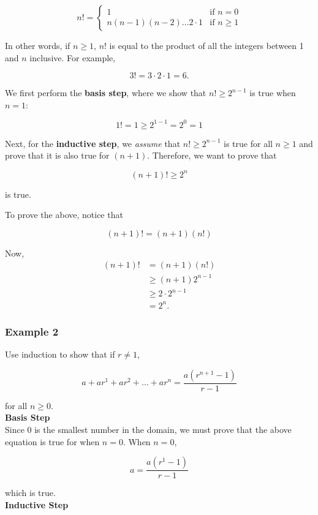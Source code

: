 \[ n! = \begin{cases} 
    1 & \text{if } n = 0 \\
    n(n - 1)(n - 2)\dots 2 \cdot 1 & \text{if } n \geq 1
 \end{cases}
\]

In other words, if $n \geq 1$, $n!$ is equal to the product of all the integers between 1 and $n$ inclusive.  For example, 

\[
 3! = 3 \cdot 2 \cdot 1 = 6.
\]

We first perform the \textbf{basis step}, where we show that $n! \geq 2^{n - 1}$ is true when $n = 1$:

\[
 1! = 1 \geq 2^{1 - 1} = 2^0 = 1
\]

Next, for the \textbf{inductive step}, we \textit{assume} that $n! \geq 2^{n - 1}$ is true for all $n \geq 1$ and prove that it is also true for $(n + 1)$.  Therefore, we want to prove that

\[
    (n + 1)! \geq 2^{n}
\]

is true.

To prove the above, notice that

\[
 (n + 1)! = (n + 1)(n!)
\]

Now,
\begin{align*}
    (n + 1)! &= (n + 1)(n!)\\
    &\geq (n + 1)2^{n - 1}\\
    &\geq 2 \cdot 2^{n - 1}\\
    &= 2^n.
\end{align*}

\subsubsection*{Example 2}

Use induction to show that if $r \neq 1$,

\[
    a + ar^1 + ar^2 + \dots + ar^n = \frac{a(r^{n + 1} - 1)}{r - 1}
\]

for all $n \geq 0$.\\

\textbf{Basis Step}\\

Since $0$ is the smallest number in the domain, we must prove that the above equation is true for when $n = 0$.  When $n = 0$,

\[
    a = \frac{a(r^1 - 1)}{r - 1}
\]

which is true.\\

\textbf{Inductive Step}\\

